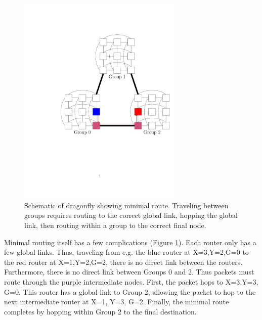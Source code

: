 \begin{figure}[h!]
\centering
\includegraphics[width=0.7\textwidth]{figures/tikz/dragonfly/dflyminroute.pdf}
\caption{Schematic of dragonfly showing minimal route. Traveling between groups requires routing to the correct global link, hopping the global link, then routing within a group to the correct final node.}
\label{fig:topologies:dflyminroute}
\end{figure}

Minimal routing itself has a few complications (Figure \ref{fig:topologies:dflyminroute}).  
Each router only has a few global links.  
Thus, traveling from e.g. the blue router at X=3,Y=2,G=0 to the red router at X=1,Y=2,G=2, there is no direct link between the routers.
Furthermore, there is no direct link between Groups 0 and 2.
Thus packets must route through the purple intermediate nodes.
First, the packet hops to X=3,Y=3, G=0.  
This router has a global link to Group 2, allowing the packet to hop to the next intermediate router at X=1, Y=3, G=2.
Finally, the minimal route completes by hopping within Group 2 to the final destination.

